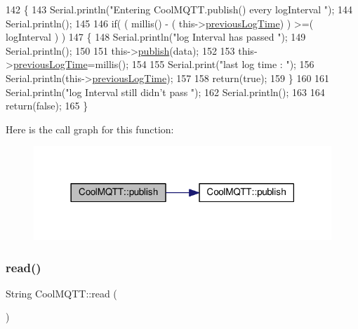 \begin{DoxyCode}
142 \{
143     Serial.println(\textcolor{stringliteral}{"Entering CoolMQTT.publish() every logInterval "});
144     Serial.println();
145     
146     \textcolor{keywordflow}{if}( ( millis() - ( this->\hyperlink{classCoolMQTT_a3db37ef9ed3b05b2a8d44edba0e7d3cc}{previousLogTime})  ) >=( logInterval ) )
147     \{
148         Serial.println(\textcolor{stringliteral}{"log Interval has passed "});
149         Serial.println();
150 
151         this->\hyperlink{classCoolMQTT_ace977b3e90ab14b1199fe5c4fb0a13ec}{publish}(data);
152 
153         this->\hyperlink{classCoolMQTT_a3db37ef9ed3b05b2a8d44edba0e7d3cc}{previousLogTime}=millis();
154 
155         Serial.print(\textcolor{stringliteral}{"last log time : "});
156         Serial.println(this->\hyperlink{classCoolMQTT_a3db37ef9ed3b05b2a8d44edba0e7d3cc}{previousLogTime});
157 
158         \textcolor{keywordflow}{return}(\textcolor{keyword}{true});
159     \}
160 
161     Serial.println(\textcolor{stringliteral}{"log Interval still didn't pass "});  
162     Serial.println();
163 
164     \textcolor{keywordflow}{return}(\textcolor{keyword}{false});
165 \}
\end{DoxyCode}
Here is the call graph for this function\+:
\nopagebreak
\begin{figure}[H]
\begin{center}
\leavevmode
\includegraphics[width=318pt]{classCoolMQTT_a65a506641740ce797ceadd4fa8a286d3_cgraph}
\end{center}
\end{figure}
\mbox{\label{classCoolMQTT_ae3c18f6ae9723746d32765f1c8f176ca}} 
\subsubsection{\texorpdfstring{read()}{read()}}
{\footnotesize\ttfamily String Cool\+M\+Q\+T\+T\+::read (\begin{DoxyParamCaption}{ }\end{DoxyParamCaption})}

